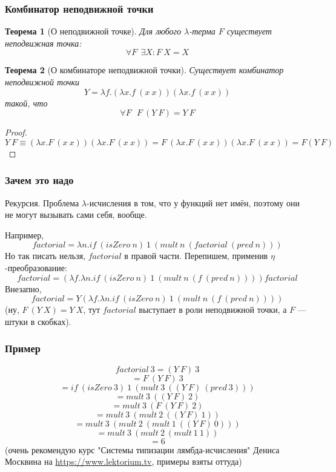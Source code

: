 \documentclass[xetex,mathserif,serif]{beamer}
\newtheorem{rustheorem}{Теорема}
\begin{document}
	\begin{frame}
		\frametitle{Комбинатор неподвижной точки}
		\begin{rustheorem}[О неподвижной точке]
			Для любого $\lambda$-терма $F$ существует неподвижная точка:
			$$\forall F\ \ \exists X : F\ X = X$$
			\vspace{-5mm}
		\end{rustheorem}
		\vspace{-5mm}
		\begin{rustheorem}[О комбинаторе неподвижной точки]
			Существует комбинатор неподвижной точки
			$$Y = \lambda f.(\lambda x.f\ (x\ x)) (\lambda x.f\ (x\ x))$$
			такой, что 
			$$\forall F\ \ \ F\ (Y\ F) = Y\ F$$
		\end{rustheorem}
		\vspace{-5mm}
		\begin{proof}
			\vspace{-7mm}
			$$Y\ F \equiv (\lambda x.F\ (x\ x))(\lambda x.F\ (x\ x)) 
				= F\ (\lambda x.F\ (x\ x))(\lambda x.F\ (x\ x)) = F(Y\ F)$$
			\vspace{-10mm}
		\end{proof}
	\end{frame}

	\begin{frame}
		\frametitle{Зачем это надо}
		Рекурсия. Проблема $\lambda$-исчисления в том, что у функций нет имён, поэтому они не могут 
		вызывать сами себя, вообще.
		
		Например,
		$$factorial = \lambda n. if\ (isZero\ n)\ 1\ (mult\ n\ (factorial\ (pred\ n)))$$
		Но так писать нельзя, $factorial$ в правой части. Перепишем, применив $\eta$-преобразование:
		$$factorial = (\lambda f.\lambda n.if\ (isZero\ n)\ 1\ (mult\ n\ (f\ (pred\ n)))) factorial$$
		Внезапно, 
		$$factorial = Y (\lambda f.\lambda n.if\ (isZero\ n)\ 1\ (mult\ n\ (f\ (pred\ n))))$$
		(ну, $F\ (Y\ X) = Y\ X$, тут $factorial$ выступает в роли неподвижной точки, а $F$ --- 
		штуки в скобках).
	\end{frame}

	\begin{frame}
		\frametitle{Пример}
		$$factorial\ 3 = (Y\ F)\ 3$$
		$$= F\ (Y\ F)\ 3$$
		$$= if\ (isZero\ 3)\ 1\ (mult\ 3\ ((Y\ F)\ (pred\ 3)))$$
		$$= mult\ 3\ ((Y\ F)\ 2)$$
		$$= mult\ 3\ (F\ (Y\ F)\ 2)$$
		$$= mult\ 3\ (mult\ 2\ ((Y\ F)\ 1))$$
		$$= mult\ 3\ (mult\ 2\ (mult\ 1\ ((Y\ F)\ 0)))$$
		$$= mult\ 3\ (mult\ 2\ (mult\ 1\ 1))$$
		$$= 6$$
		(очень рекомендую курс "Системы типизации лямбда-исчисления" Дениса Москвина на \url{https://www.lektorium.tv}, примеры взяты оттуда)
	\end{frame}
\end{document}
